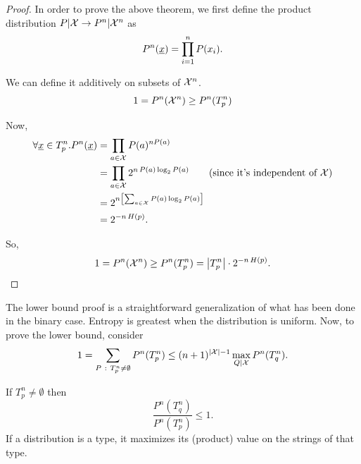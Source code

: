 \begin{proof}
	In order to prove the above theorem, we first define the product distribution $P|\mathcal{X} \rightarrow P^n|\mathcal{X}^n$ as 
	\begin{equation*}
		P^n(\underline{x}) = \prod_{i = 1}^nP(x_i).
	\end{equation*}

	We can define it additively on subsets of $\mathcal{X}^n$.
	\begin{equation*}
		1 = P^n(\mathcal{X}^n) \ge P^n(T_p^n)
	\end{equation*}

	Now,
	\begin{align*}
		\forall \str{x} \in T_p^n . P^n(\str{x})
		& =
		\prod_{a \in \X} P(a)^{n P(a)}
		\\
		& =
		\prod_{a \in \X} 2^{n \, P(a)\log_2 P(a)} \tag{since it's independent of $\X$}
		\\
		& =
		2^{n \left[\sum_{a \in \X} P(a) \log_2 P(a) \right]}
		\\
		& =
		2^{-n \, H(p)}.
	\end{align*}

	So,
	\begin{equation*}
		1 = P^n(\mathcal{X}^n) \ge P^n(T^n_p) = \left|{T_p^n}\right| \cdot 2^{-n \, H(p)}.
	\end{equation*}
\end{proof}

The lower bound proof is a straightforward generalization of what has been done in the binary case.
Entropy is greatest when the distribution is uniform.
Now, to prove the lower bound, consider
\begin{equation*}
	1
	=
	\sum_{P\ :\ T_p^n \neq \emptyset} P^n(T_p^n)
	\le
	(n+1)^{\left|{\mathcal{X}}\right|-1} \max_{Q|\mathcal{X}} P^n(T_q^n).
\end{equation*}

\begin{obs}
	If $T^n_p \neq \emptyset$ then 
	\begin{equation*}
		\frac{P^n(T^n_q)}{P^n(T^n_p)} \le 1.
	\end{equation*}
	If a distribution is a type, it maximizes its (product) value on the strings of that type. 
\end{obs}

